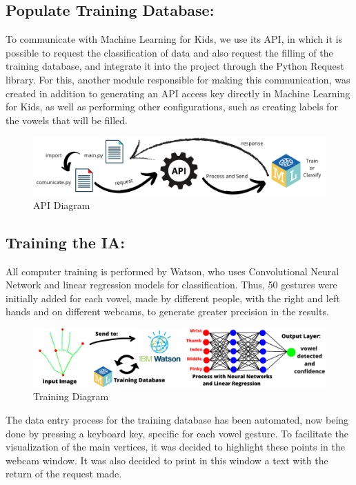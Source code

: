 \documentclass[a4paper, 12pt]{article}
\begin{document}
\subsection{Populate Training Database:}
To communicate with Machine Learning for Kids, we use its API, in which it is possible to request the classification of data and also request the filling of the training database, and integrate it into the project through the Python Request library\cite{requests}. For this, another module responsible for making this communication, was created in addition to generating an API access key directly in Machine Learning for Kids, as well as performing other configurations, such as creating labels for the vowels that will be filled.

 \begin{figure}[!ht]
\centering
\includegraphics[scale=0.5]{img/api_diagram.png}
\caption{API Diagram}
\label{figure_6}
\end{figure}


\subsection{Training the IA:}
All computer training is performed by Watson, who uses Convolutional Neural Network and linear regression models for classification. Thus, 50 gestures were initially added for each vowel, made by different people, with the right and left hands and on different webcams, to generate greater precision in the results.

\begin{figure}[!ht]
\centering
\includegraphics[scale=0.5]{img/training_diagram.png}
\caption{Training Diagram}
\label{figure_7}
\end{figure}

The data entry process for the training database has been automated, now being done by pressing a keyboard key, specific for each vowel gesture.
To facilitate the visualization of the main vertices, it was decided to highlight these points in the webcam window. It was also decided to print in this window a text with the return of the request made.
\end{document}
